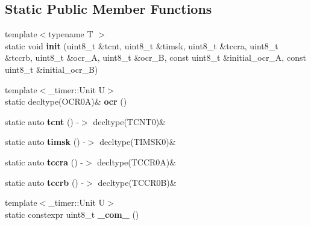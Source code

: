 \subsection*{Static Public Member Functions}
\begin{DoxyCompactItemize}
\item 
{\footnotesize template$<$typename T $>$ }\\static void {\bfseries init} (uint8\+\_\+t \&tcnt, uint8\+\_\+t \&timsk, uint8\+\_\+t \&tccra, uint8\+\_\+t \&tccrb, uint8\+\_\+t \&ocr\+\_\+A, uint8\+\_\+t \&ocr\+\_\+B, const uint8\+\_\+t \&initial\+\_\+ocr\+\_\+A, const uint8\+\_\+t \&initial\+\_\+ocr\+\_\+B)\hypertarget{struct__timer0_1_1TimerDef_ae9a4cef5f307fcb249d041ea410a0745}{}\label{struct__timer0_1_1TimerDef_ae9a4cef5f307fcb249d041ea410a0745}

\item 
{\footnotesize template$<$\+\_\+timer\+::\+Unit U$>$ }\\static decltype(O\+C\+R0A)\& {\bfseries ocr} ()\hypertarget{struct__timer0_1_1TimerDef_af731f20e2caa0c4f94d31377d4a43ab5}{}\label{struct__timer0_1_1TimerDef_af731f20e2caa0c4f94d31377d4a43ab5}

\item 
static auto {\bfseries tcnt} () -\/$>$ decltype(T\+C\+N\+T0)\&\hypertarget{struct__timer0_1_1TimerDef_ad74073fc118a69a4c02769b7fe56402d}{}\label{struct__timer0_1_1TimerDef_ad74073fc118a69a4c02769b7fe56402d}

\item 
static auto {\bfseries timsk} () -\/$>$ decltype(T\+I\+M\+S\+K0)\&\hypertarget{struct__timer0_1_1TimerDef_a30f1f4a5888376608e0b729e2614ba63}{}\label{struct__timer0_1_1TimerDef_a30f1f4a5888376608e0b729e2614ba63}

\item 
static auto {\bfseries tccra} () -\/$>$ decltype(T\+C\+C\+R0A)\&\hypertarget{struct__timer0_1_1TimerDef_a644edd603ceab7970c7398f6fe5b95a9}{}\label{struct__timer0_1_1TimerDef_a644edd603ceab7970c7398f6fe5b95a9}

\item 
static auto {\bfseries tccrb} () -\/$>$ decltype(T\+C\+C\+R0B)\&\hypertarget{struct__timer0_1_1TimerDef_a85d21a64199315e126c6218c536952eb}{}\label{struct__timer0_1_1TimerDef_a85d21a64199315e126c6218c536952eb}

\item 
{\footnotesize template$<$\+\_\+timer\+::\+Unit U$>$ }\\static constexpr uint8\+\_\+t {\bfseries \+\_\+com\+\_} ()\hypertarget{struct__timer0_1_1TimerDef_aa142ef4342ace48bc1f56662a758fff4}{}\label{struct__timer0_1_1TimerDef_aa142ef4342ace48bc1f56662a758fff4}


\end{DoxyCompactItemize}
